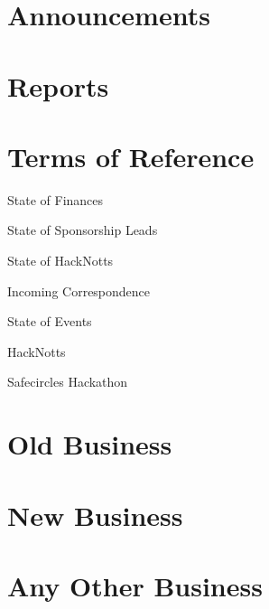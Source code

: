 \documentclass[11pt,hacksoc,agenda]{meetingmins}
\begin{document}
\maketitle

\section{Announcements}
\begin{items}
\item
\end{items}

\section{Reports}

\section{Terms of Reference}
\begin{items}
\item {State of Finances}
\item {State of Sponsorship Leads}
\item {State of HackNotts}
\item {Incoming Correspondence}
\item {State of Events}
\end{items}

\item {HackNotts}
\item {Safecircles Hackathon}

\section{Old Business}
\begin{items}
\item
\end{items}

\section{New Business}
\begin{items}
\item
\end{items}

\section{Any Other Business}

\vspace{1em}
\end{document}
